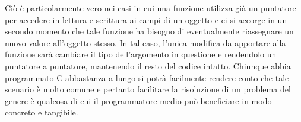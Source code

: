 Ciò è particolarmente vero nei casi in cui una funzione utilizza già un puntatore per accedere 
in lettura e scrittura ai campi di un oggetto e ci si accorge in un secondo momento che tale funzione 
ha bisogno di eventualmente riassegnare un nuovo valore all’oggetto stesso. In tal caso, l’unica modifica 
da apportare alla funzione sarà cambiare il tipo dell’argomento in questione e rendendolo un puntatore 
a puntatore, mantenendo il resto del codice intatto. Chiunque abbia programmato C abbastanza a 
lungo si potrà facilmente rendere conto che tale scenario è molto comune e pertanto facilitare 
la risoluzione di un problema del genere è qualcosa di cui il programmatore 
medio può beneficiare in modo concreto e tangibile. \\
